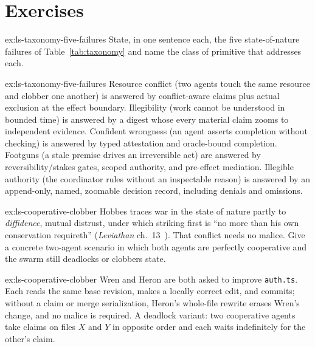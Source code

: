 \documentclass[11pt,a4paper]{article}
\theoremstyle{definition}
\theoremstyle{plain}
\begin{document}
\section{Exercises}
\label{sec:ls-exercises}


\begin{pdexercise}[kind=Check,rating=1]{ex:ls-taxonomy-five-failures}
State, in one sentence each, the five state-of-nature failures of
Table~\ref{tab:taxonomy} and name the class of primitive that addresses each.
\end{pdexercise}
\begin{pdsolution}{ex:ls-taxonomy-five-failures}
Resource conflict (two agents touch the same resource and clobber one another) is answered by conflict-aware claims plus actual exclusion at the effect boundary. Illegibility (work cannot be understood in bounded time) is answered by a digest whose every material claim zooms to independent evidence. Confident wrongness (an agent asserts completion without checking) is answered by typed attestation and oracle-bound completion. Footguns (a stale premise drives an irreversible act) are answered by reversibility/stakes gates, scoped authority, and pre-effect mediation. Illegible authority (the coordinator rules without an inspectable reason) is answered by an append-only, named, zoomable decision record, including denials and omissions.
\end{pdsolution}
\begin{pdexercise}[kind=Check,rating=1]{ex:ls-cooperative-clobber}
Hobbes traces war in the state of nature partly to \emph{diffidence}, mutual
distrust, under which striking first is ``no more than his own conservation
requireth'' (\emph{Leviathan} ch.~13~). That conflict needs
no malice. Give a concrete two-agent
scenario in which both agents are perfectly cooperative and the swarm still
deadlocks or clobbers state.
\end{pdexercise}
\begin{pdsolution}{ex:ls-cooperative-clobber}
Wren and Heron are both asked to improve \texttt{auth.ts}. Each reads the same base revision, makes a locally correct edit, and commits; without a claim or merge serialization, Heron's whole-file rewrite erases Wren's change, and no malice is required. A deadlock variant: two cooperative agents take claims on files $X$ and $Y$ in opposite order and each waits indefinitely for the other's claim.
\end{pdsolution}
\end{document}
